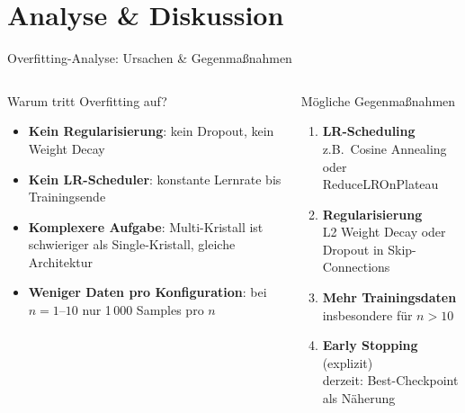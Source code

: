 \documentclass[aspectratio=169]{beamer}
\begin{document}
\section{Analyse \& Diskussion}

\begin{frame}{Overfitting-Analyse: Ursachen \& Gegenmaßnahmen}
  \begin{columns}[T]
      \begin{alertblock}{Warum tritt Overfitting auf?}
        \begin{itemize}
          \item \textbf{Kein Regularisierung}: kein Dropout, kein Weight Decay
          \item \textbf{Kein LR-Scheduler}: konstante Lernrate bis Trainingsende
          \item \textbf{Komplexere Aufgabe}: Multi-Kristall ist schwieriger als Single-Kristall, gleiche Architektur
          \item \textbf{Weniger Daten pro Konfiguration}: bei $n=1$--$10$ nur 1\,000 Samples pro $n$
        \end{itemize}
      \end{alertblock}

      \begin{block}{Mögliche Gegenmaßnahmen}
        \begin{enumerate}
          \item \textbf{LR-Scheduling}\\
                z.B.\ Cosine Annealing oder ReduceLROnPlateau
          \item \textbf{Regularisierung}\\
                L2 Weight Decay oder Dropout in Skip-Connections
          \item \textbf{Mehr Trainingsdaten}\\
                insbesondere für $n > 10$
          \item \textbf{Early Stopping} (explizit)\\
                derzeit: Best-Checkpoint als Näherung
        \end{enumerate}
      \end{block}
  \end{columns}
\end{frame}
\end{document}
